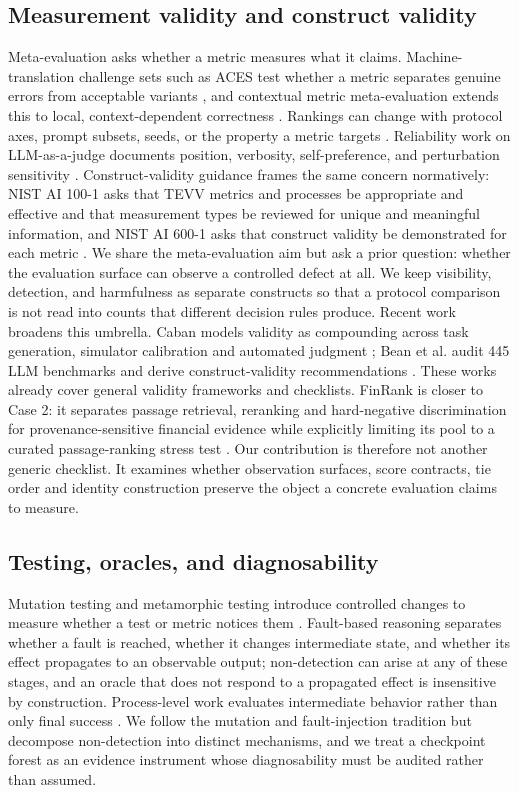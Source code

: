 \documentclass[10pt,conference]{IEEEtran}
\begin{document}
\subsection{Measurement validity and construct validity}
Meta-evaluation asks whether a metric measures what it claims. Machine-translation challenge sets such as ACES test whether a metric separates genuine errors from acceptable variants \cite{amrhein2022aces,amrhein2023aces,moghe2024mtmeta}, and contextual metric meta-evaluation extends this to local, context-dependent correctness \cite{deviyani2025contextual}. Rankings can change with protocol axes, prompt subsets, seeds, or the property a metric targets \cite{kendiukhov2026ranking,du2026stability,ross2024metric}. Reliability work on LLM-as-a-judge documents position, verbosity, self-preference, and perturbation sensitivity \cite{liq2025scoringbias,lis2025llmjduge}. Construct-validity guidance frames the same concern normatively: NIST AI 100-1 asks that TEVV metrics and processes be appropriate and effective and that measurement types be reviewed for unique and meaningful information, and NIST AI 600-1 asks that construct validity be demonstrated for each metric \cite{nist2023airmf,nist2024genai}. We share the meta-evaluation aim but ask a prior question: whether the evaluation surface can observe a controlled defect at all. We keep visibility, detection, and harmfulness as separate constructs so that a protocol comparison is not read into counts that different decision rules produce.
Recent work broadens this umbrella. Caban models validity as compounding across task generation, simulator calibration and automated judgment \cite{caban2026validity}; Bean et al. audit 445 LLM benchmarks and derive construct-validity recommendations \cite{bean2025construct}. These works already cover general validity frameworks and checklists. FinRank is closer to Case 2: it separates passage retrieval, reranking and hard-negative discrimination for provenance-sensitive financial evidence while explicitly limiting its pool to a curated passage-ranking stress test \cite{mansouri2026finrank}. Our contribution is therefore not another generic checklist. It examines whether observation surfaces, score contracts, tie order and identity construction preserve the object a concrete evaluation claims to measure.
\subsection{Testing, oracles, and diagnosability}
Mutation testing and metamorphic testing introduce controlled changes to measure whether a test or metric notices them \cite{cho2025metamorphic}. Fault-based reasoning separates whether a fault is reached, whether it changes intermediate state, and whether its effect propagates to an observable output; non-detection can arise at any of these stages, and an oracle that does not respond to a propagated effect is insensitive by construction. Process-level work evaluates intermediate behavior rather than only final success \cite{fan2026agentprocessbench,chung2026process}. We follow the mutation and fault-injection tradition but decompose non-detection into distinct mechanisms, and we treat a checkpoint forest as an evidence instrument whose diagnosability must be audited rather than assumed.
\end{document}

